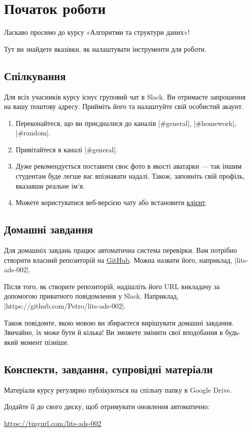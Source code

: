 \documentclass[12pt,a4paper]{article}
\begin{document}
\section*{Початок роботи}

Ласкаво просимо до курсу «Алгоритми та структури даних»!

Тут ви знайдете вказівки, як налаштувати інструменти для роботи.


\subsection*{Спілкування}

Для всіх учасників курсу існує груповий чат в Slack.
Ви отримаєте запрошення на вашу поштову адресу.
Прийміть його та налаштуйте свій особистий акаунт.

\begin{enumerate}
    \item Переконайтеся, що ви приєдналися до каналів |#general|, |#homework|, |#random|.
    \item Привітайтеся в каналі |#general|.
    \item Дуже рекомендується поставити своє фото в якості аватарки --- так іншим студентам буде легше вас впізнавати надалі. Також, заповніть свій профіль, вказавши реальне ім’я.
    \item Можете користуватися веб-версією чату або встановити \href{https://slack.com/apps}{клієнт}.
\end{enumerate}


\subsection*{Домашні завдання}

Для домашніх завдань працює автоматична система перевірки.
Вам потрібно створити власний репозиторій на \href{https://github.com}{\color{blue}GitHub}.
Можна назвати його, наприклад, |lits-ads-002|.

Після того, як створите репозиторій, надішліть його URL викладачу за допомогою приватного повідомлення у Slack.
Наприклад, |https://github.com/Petro/lits-ads-002|.

Також повідомте, якою мовою ви збираєтеся вирішувати домашні завдання.
Звичайно, їх може бути й кілька!
Ви зможете змінити свої вподобання в будь-який момент пізніше.


\subsection*{Конспекти, завдання, супровідні матеріали}

Матеріали курсу регулярно публікуються на спільну папку в Google Drive.

Додайте її до свого диску, щоб отримувати оновлення автоматично:

\href{https://tinyurl.com/lits-ads-002}{\color{blue}https://tinyurl.com/lits-ads-002}
\end{document}
